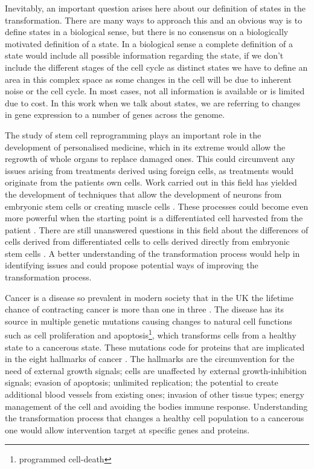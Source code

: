 Inevitably, an important question arises here about our definition of states in the transformation. There are many ways to approach this and an obvious way is to define states in a biological sense, but there is no consensus on a biologically motivated definition of a state. In a biological sense a complete definition of a state would include all possible information regarding the state, if we don't include the different stages of the cell cycle as distinct states we have to define an area in this complex space as some changes in the cell will be due to inherent noise or the cell cycle. In most cases, not all information is available or is limited due to cost. In this work when we talk about states, we are referring to changes in gene expression to a number of genes across the genome.

The study of stem cell reprogramming plays an important role in the development of personalised medicine, which in its extreme would allow the regrowth of whole organs to replace damaged ones. This could circumvent any issues arising from treatments derived using foreign cells, as treatments would originate from the patients own cells. Work carried out in this field has yielded the development of techniques that allow the development of neurons from embryonic stem cells \citep{Vierbuchen:2010fa, Pang:2011ce} or creating muscle cells \citep{Ieda:2010ir, Efe:2011bpa}. These processes could become even more powerful when the starting point is a differentiated cell harvested from the patient \citep{Takahashi:2006hi}. There are still unanswered questions in this field about the differences of cells derived from differentiated cells to cells derived directly from embryonic stem cells \citep{Carey:2011bs, Bock:2011kx}. A better understanding of the transformation process would help in identifying issues and could propose potential ways of improving the transformation process.

Cancer is a disease so prevalent in modern society that in the UK the lifetime chance of contracting cancer is more than one in three \citep{Sasieni:2011}. The disease has its source in multiple genetic mutations causing changes to natural cell functions such as cell proliferation and apoptosis\footnote{programmed cell-death}, which transforms cells from a healthy state to a cancerous state. These mutations code for proteins that are implicated in the eight hallmarks of cancer \citep{Hanahan:2011gu}. The hallmarks are the circumvention for the need of external growth signals; cells are unaffected by external growth-inhibition signals; evasion of apoptosis; unlimited replication; the potential to create additional blood vessels from existing ones; invasion of other tissue types; energy management of the cell and avoiding the bodies immune response. Understanding the transformation process that changes a healthy cell population to a cancerous one would allow intervention target at specific genes and proteins.

